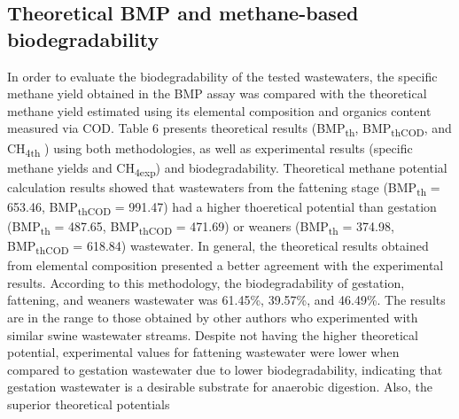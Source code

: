 \subsection{Theoretical BMP and methane-based biodegradability}
In order to evaluate the biodegradability of the tested wastewaters, the specific methane yield obtained in the BMP assay was compared with the theoretical methane yield estimated using its elemental composition and organics content measured via COD. Table 6 presents theoretical results (BMP\textsubscript{th}, BMP\textsubscript{thCOD}, and CH\textsubscript{4th} ) using both methodologies, as well as experimental results (specific methane yields and CH\textsubscript{4exp}) and  biodegradability.  Theoretical methane potential calculation results showed that wastewaters from the fattening stage (BMP\textsubscript{th} = 653.46, BMP\textsubscript{thCOD} = 991.47) had a higher thoeretical potential than gestation (BMP\textsubscript{th} = 487.65, BMP\textsubscript{thCOD} = 471.69) or weaners (BMP\textsubscript{th} = 374.98, BMP\textsubscript{thCOD} = 618.84) wastewater. In general, the theoretical results obtained from elemental composition presented a better agreement with the experimental results. According to this methodology, the biodegradability of gestation, fattening, and weaners wastewater was 61.45\%, 39.57\%, and 46.49\%. The results are in the range to those obtained by other authors \cite{Zhang_2014} who experimented with similar swine wastewater streams. Despite not having the higher theoretical potential, experimental values for fattening wastewater were lower when compared to gestation wastewater due to lower biodegradability, indicating that gestation wastewater is a desirable substrate for anaerobic digestion. Also, the superior theoretical potentials 